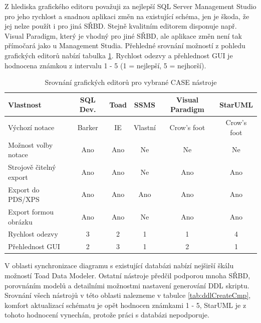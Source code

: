 \documentclass[czech,bachelor,public,dept460,male,oneside]{diploma}
\begin{document}
	Z hlediska grafického editoru považuji za nejlepší SQL Server Management Studio pro jeho rychlost a snadnou aplikaci změn na existující schéma, jen je škoda, že jej nelze použít i pro jiná SŘBD. Stejně kvalitním editorem disponuje např. Visual Paradigm, který je vhodný pro jiné SŘBD, ale aplikace změn není tak přímočará jako u Management Studia. Přehledné srovnání možností z pohledu grafických editorů nabízí tabulka \ref{tab:geditCmp}. Rychlost odezvy a přehlednost GUI je hodnocena známkou z intervalu 1 - 5 (1 = nejlepší, 5 = nejhorší).
	
	\begin{table}[h!]
		\centering
		\caption{Srovnání grafických editorů pro vybrané CASE nástroje}
		\label{tab:geditCmp}
		\begin{tabular}{l c c c c c}
			\toprule
			Vlastnost & SQL Dev. & Toad & SSMS & Visual Paradigm & StarUML \\
			\midrule
			Výchozí notace & Barker & IE & Vlastní & Crow's foot & Crow's foot \\
			Možnost volby notace & Ano & Ano & Ne & Ne & Ne \\
			Strojově čitelný export & Ano & Ano & Ne & Ano & Ano \\
			Export do PDS/XPS & Ano & Ano & Ano & Ano & Ano \\
			Export formou obrázku & Ano & Ano & Ne & Ano & Ano \\
			Rychlost odezvy & 3 & 2 & 1 & 1 & 4 \\
			Přehlednost GUI & 2 & 3 & 1 & 2 & 1 \\
			\midrule
		\end{tabular}
	\end{table}
	
	\newpage
	V oblasti synchronizace diagramu s existující databázi nabízí nejširší škálu možností Toad Data Modeler. Ostatní nástroje předčil podporou mnoha SŘBD, porovnáním modelů a detailními možnostmi nastavení generování DDL skriptu. Srovnání všech nástrojů v této oblasti nalezneme v tabulce \ref{tab:ddlCreateCmp}, komfort aktualizací schématu je opět hodnocen známkami 1 - 5, StarUML je z tohoto hodnocení vynechán, protože práci s databázi nepodporuje.
	
\end{document}
